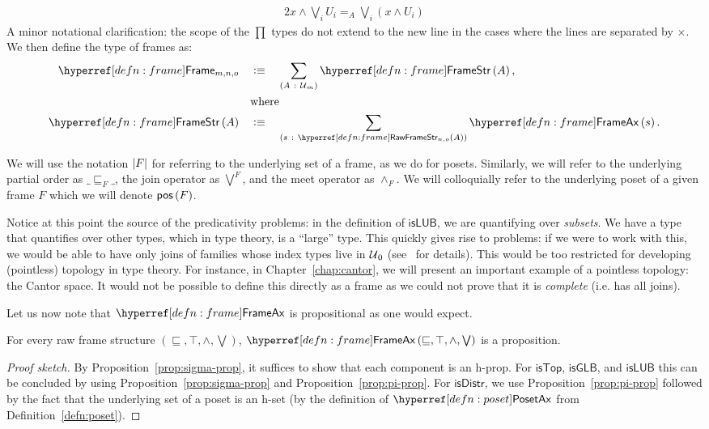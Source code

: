 \begin{defn}[Frame]
\begin{alignat*}{2}
{{          x \wedge \bigvee_i U_i} =_A \bigvee_i \left( x \wedge U_i \right)
      }
  \end{alignat*}
  A minor notational clarification: the scope of the $\prod$ types do not extend to the new
  line in the cases where the lines are separated by $\times$. We then define the type of
  frames as:
  \begin{align*}
    \framety{m}{n}{o} \quad&\is\quad \sigmaty{A}{\univ{}_m}{\framestr{A}},            \\
                       &\text{where}                                          \\
    \framestr{A}      \quad&\is\quad \sigmaty{s}{\rawframestr{n}{o}{A}}{\frameax{s}}  .
  \end{align*}
\end{defn}

We will use the notation $\left| F \right|$ for referring to the underlying set of a frame, as we
do for posets. Similarly, we will refer to the underlying partial order as $\_\sqsubseteq_F\_$, the
join operator as $\bigvee^F$, and the meet operator as $\wedge_F$. We will colloquially refer to the
underlying poset of a given frame $F$ which we will denote $\mathsf{pos}\left(F\right)$.

Notice at this point the source of the predicativity problems: in the definition of
$\mathsf{isLUB}$, we are quantifying over \emph{subsets}. We have a type that quantifies
over other types, which in type theory, is a ``large'' type. This quickly gives rise to
problems: if we were to work with this, we would be able to have only joins of families
whose index types live in $\mathcal{U}{}_0$ (see~\cite{sambin-tutorial, coq-sambin} for
details). This would be too restricted for developing (pointless) topology in type theory.
For instance, in Chapter~\ref{chap:cantor}, we will present an important example of a
pointless topology: the Cantor space. It would not be possible to define this directly as
a frame as we could not prove that it is \emph{complete} (i.e. has all joins).

Let us now note that $\frameaxnm{}$ is propositional as one would expect.
\begin{prop}\label{prop:frame-ax-prop}
  For every raw frame structure $(\sqsubseteq, \top, \wedge, \bigvee)$, $\frameax{\sqsubseteq, \top, \wedge, \bigvee}$ is a proposition.
\end{prop}
\begin{proof}[Proof sketch]
  By Proposition~\ref{prop:sigma-prop}, it suffices to show that each component is an
  h-prop. For $\mathsf{isTop}$, $\mathsf{isGLB}$, and $\mathsf{isLUB}$ this can be
  concluded by using Proposition~\ref{prop:sigma-prop} and Proposition~\ref{prop:pi-prop}.
  For $\mathsf{isDistr}$, we use Proposition~\ref{prop:pi-prop} followed by the fact that
  the underlying set of a poset is an h-set (by the definition of $\posetaxnm{}$ from
  Definition~\ref{defn:poset}).
\end{proof}

